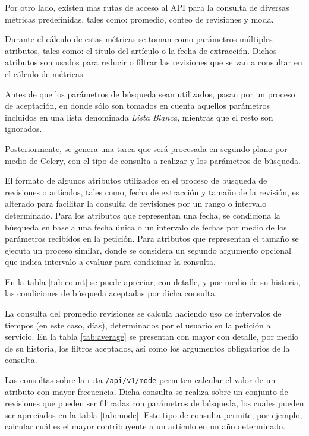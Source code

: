 Por otro lado, existen mas rutas de acceso al API para la consulta de diversas métricas predefinidas, tales como: promedio, conteo de revisiones y moda.

Durante el cálculo de estas métricas se toman como parámetros múltiples atributos, tales como: el título del artículo o la fecha de extracción.
Dichos atributos son usados para reducir o filtrar las revisiones que se van a consultar en el cálculo de  métricas.

Antes de que los parámetros de búsqueda sean utilizados, pasan por un proceso de aceptación, en donde sólo son tomados en cuenta aquellos parámetros incluidos en una lista denominada \textit{Lista Blanca}, mientras que el resto son ignorados.

Posteriormente, se genera una tarea que será procesada en segundo plano por medio de Celery, con el tipo de consulta a realizar y los parámetros de búsqueda.

El formato de algunos atributos utilizados en el proceso de búsqueda de revisiones o artículos, tales como, fecha de extracción y tamaño de la revisión, es alterado para facilitar la consulta de revisiones por un rango o intervalo determinado.
Para los atributos que representan una fecha, se condiciona la búsqueda en base a una fecha única o un intervalo de fechas por medio de los parámetros recibidos en la petición.
Para atributos que representan el tamaño se ejecuta un proceso similar, donde se considera un segundo argumento opcional que indica intervalo a evaluar para condicinar la consulta.

En la tabla \ref{tab:count} se puede apreciar, con detalle, y por medio de su historia, las condiciones de búsqueda aceptadas por dicha consulta.



La consulta del promedio revisiones se calcula haciendo uso de intervalos de tiempos (en este caso, días), determinados por el usuario en la petición al servicio.
En la tabla \ref{tab:average} se presentan con mayor con detalle, por medio de su historia, los filtros aceptados, así como los argumentos obligatorios de la consulta.



Las consultas sobre la ruta \texttt{/api/v1/mode} permiten calcular el valor de un atributo con mayor frecuencia.
Dicha consulta se realiza sobre un conjunto de revisiones que pueden ser filtradas con parámetros de búsqueda, los cuales pueden ser apreciados en la tabla \ref{tab:mode}.
Este tipo de consulta permite, por ejemplo, calcular cuál es el mayor contribuyente a un artículo en un año determinado.

